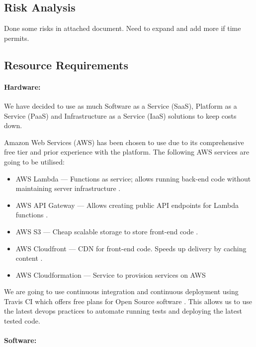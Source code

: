 \documentclass[a4paper,11pt]{article}
\begin{document}
\subsection{Risk Analysis}


Done some risks in attached document. Need to expand and add more if time permits.

\subsection{Resource Requirements}

\paragraph{Hardware:}

We have decided to use as much Software as a Service (SaaS), Platform as a
Service (PaaS) and Infrastructure as a Service (IaaS) solutions to keep costs
down.

Amazon Web Services (AWS) has been chosen to use due to its comprehensive free
tier and prior experience with the platform. The following AWS services are
going to be utilised:

\begin{itemize}
  \item AWS Lambda --- Functions as service; allows running back-end code
    without maintaining server infrastructure \autocite{aws:2}.
  \item AWS API Gateway --- Allows creating public API endpoints for Lambda
    functions \autocite{aws:3}.
  \item AWS S3 --- Cheap scalable storage to store front-end code
    \autocite{aws:4}.
  \item AWS Cloudfront --- CDN for front-end code. Speeds up delivery by caching
    content \autocite{aws:5}.
  \item AWS Cloudformation --- Service to provision services on AWS
    \autocite{aws:6}
\end{itemize}

We are going to use continuous integration and continuous deployment using
Travis CI which offers free plans for Open Source software \autocite{trci:7}. This allows us to use
the latest devops practices to automate running tests and deploying the latest
tested code.

\paragraph{Software:}
\end{document}
